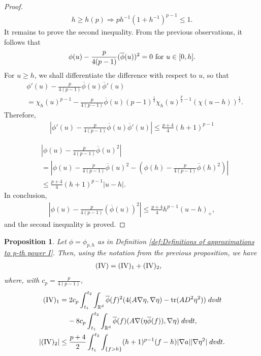 \documentclass[12pt,american]{amsart}
\numberwithin{equation}{section}
\theoremstyle{plain}
\newtheorem{prop}[thm]{Proposition}
\theoremstyle{definition}                  %
\def\tr{\textnormal{tr}}
\begin{document}
\begin{proof}
  \begin{align*}
    h\geq h(p) \Rightarrow p h^{-1}(1+h^{-1})^{p-1} \leq 1. 
  \end{align*} 
  It remains to prove the second inequality. From the previous observations, it follows that
  \begin{align*}
    \phi(u) - \frac{p}{4(p-1)}(\overline{\phi}(u))^2 = 0 \textnormal{ for } u \in [0,h].
  \end{align*}
  For $u\geq h$, we shall differentiate the difference with respect to $u$, so that
  \begin{align*}
    & \phi'(u) - \frac{p}{4(p-1)}\overline{\phi}(u)\overline{\phi}'(u)\\
    & = \chi_h(u)^{p-1}-\frac{p}{4(p-1)}\overline{\phi}(u)(p-1)^{\frac{1}{2}}\chi_{h}(u)^{\frac{p}{2}-1}\left (\chi(u-h) \right )^{\frac{1}{2}}.
  \end{align*}
  Therefore, 
  \begin{align*}
    |\phi'(u) - \frac{p}{4(p-1)}\overline{\phi}(u)\overline{\phi}'(u)| \leq \frac{p+4}{4}(h+1)^{p-1}
  \end{align*}

  \begin{align*}
    & |\phi(u)- \frac{p}{4(p-1)}\overline{\phi}(u)^2|\\
    & = \left |\phi(u)-\frac{p}{4(p-1)}\overline{\phi}(u)^2-\left ( \phi(h)- \frac{p}{4(p-1)}\overline{\phi}(h)^2 \right ) \right |\\
    & \leq \frac{p+4}{4}(h+1)^{p-1}|u-h|.
  \end{align*}
  In conclusion, 
  \begin{align*}
    |\phi(u)- \frac{p}{4(p-1)}(\overline{\phi}(u))^2| \leq \frac{p+4}{4} h^{p-1}(u-h)_+,
  \end{align*}
  and the second inequality is proved.
  \end{proof}
  
  \begin{prop}\label{prop:energy inequality term IV}
    Let $\phi=\phi_{p,h}$ as in Definition \ref{def:Definitions of approximations to p-th power I}. Then, using the notation from the previous proposition, we have
    \begin{align*}
      (\textnormal{IV}) & = (\textnormal{IV})_1+(\textnormal{IV})_2,
    \end{align*}
    where, with $c_p=\frac{p}{4(p-1)}$,
    \begin{align*}
      (\textnormal{IV})_1 & = 2c_p\int_{t_1}^{t_2}\int_{\mathbb{R}^d}\overline{\phi}(f)^2 (4(A\nabla \eta,\nabla \eta)-\tr(AD^2\eta^2))\;dvdt\\
      &\;\;\;\;-8c_p\int_{t_1}^{t_2}\int_{\mathbb{R}^d}\overline{\phi}(f) (A\nabla (\eta \overline{\phi}(f)),\nabla \eta)\;dvdt,\\
      |(\textnormal{IV})_2| & \leq \frac{p+4}{2}\int_{t_1}^{t_2}\int_{\{f >h\} }(h+1)^{p-1}(f-h)|\nabla a| |\nabla \eta^2|\;dvdt.		  
    \end{align*}	  
  \end{prop}
\end{document}
